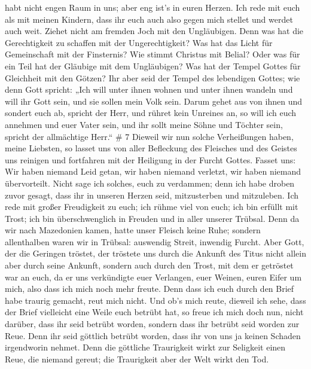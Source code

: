 habt nicht engen Raum in uns; aber eng ist's in euren Herzen.
 Ich rede mit euch als mit meinen Kindern, dass ihr euch
auch also gegen mich stellet und werdet auch weit.  Ziehet
nicht am fremden Joch mit den Ungläubigen. Denn was hat die
Gerechtigkeit zu schaffen mit der Ungerechtigkeit? Was hat das Licht für
Gemeinschaft mit der Finsternis?  Wie stimmt Christus mit
Belial? Oder was für ein Teil hat der Gläubige mit dem Ungläubigen?
 Was hat der Tempel Gottes für Gleichheit mit den Götzen?
Ihr aber seid der Tempel des lebendigen Gottes; wie denn Gott spricht:
„Ich will unter ihnen wohnen und unter ihnen wandeln und will ihr Gott
sein, und sie sollen mein Volk sein.  Darum gehet aus von
ihnen und sondert euch ab, spricht der Herr, und rühret kein Unreines
an, so will ich euch annehmen  und euer Vater sein, und ihr
sollt meine Söhne und Töchter sein, spricht der allmächtige Herr.`` \# 7
 Dieweil wir nun solche Verheißungen haben, meine Liebsten,
so lasset uns von aller Befleckung des Fleisches und des Geistes uns
reinigen und fortfahren mit der Heiligung in der Furcht Gottes.
 Fasset uns: Wir haben niemand Leid getan, wir haben niemand
verletzt, wir haben niemand übervorteilt.  Nicht sage ich
solches, euch zu verdammen; denn ich habe droben zuvor gesagt, dass ihr
in unseren Herzen seid, mitzusterben und mitzuleben.  Ich
rede mit großer Freudigkeit zu euch; ich rühme viel von euch; ich bin
erfüllt mit Trost; ich bin überschwenglich in Freuden und in aller
unserer Trübsal.  Denn da wir nach Mazedonien kamen, hatte
unser Fleisch keine Ruhe; sondern allenthalben waren wir in Trübsal:
auswendig Streit, inwendig Furcht.  Aber Gott, der die
Geringen tröstet, der tröstete uns durch die Ankunft des Titus
 nicht allein aber durch seine Ankunft, sondern auch durch
den Trost, mit dem er getröstet war an euch, da er uns verkündigte euer
Verlangen, euer Weinen, euren Eifer um mich, also dass ich mich noch
mehr freute.  Denn dass ich euch durch den Brief habe
traurig gemacht, reut mich nicht. Und ob's mich reute, dieweil ich sehe,
dass der Brief vielleicht eine Weile euch betrübt hat,  so
freue ich mich doch nun, nicht darüber, dass ihr seid betrübt worden,
sondern dass ihr betrübt seid worden zur Reue. Denn ihr seid göttlich
betrübt worden, dass ihr von uns ja keinen Schaden irgendworin nehmet.
 Denn die göttliche Traurigkeit wirkt zur Seligkeit einen
Reue, die niemand gereut; die Traurigkeit aber der Welt wirkt den Tod.
